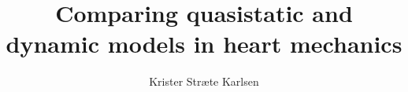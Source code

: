 \documentclass[a4paper]{memoir}
\title{Comparing quasistatic and dynamic models in heart mechanics}
\subtitle{}
\author{Krister Stræte Karlsen}
\begin{document}
\masterfrontpage
\end{document}
